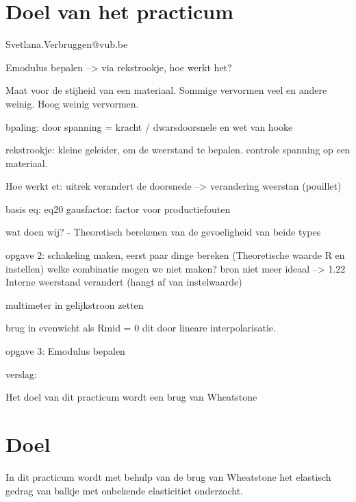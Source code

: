 \section{Doel van het practicum}

Svetlana.Verbruggen@vub.be

Emodulus bepalen
--> via rekstrookje, hoe werkt het?

Maat voor de stijheid van een materiaal. Sommige vervormen veel en andere weinig. Hoog weinig vervormen.

bpaling: door spanning = kracht / dwarsdoorsnele en wet van hooke

rekstrookje: kleine geleider, om de weerstand te bepalen. controle spanning op een materiaal.

Hoe werkt et: uitrek verandert de doorsnede --> verandering weerstan (pouillet)

basis eq: eq20
gausfactor: factor voor productiefouten

wat doen wij?
- Theoretisch berekenen van de gevoeligheid van beide types

opgave 2: schakeling maken, eerst paar dinge bereken (Theoretische waarde R en instellen)
welke combinatie mogen we niet maken?
bron niet meer ideaal --> 1.22
Interne weerstand verandert (hangt af van instelwaarde)

multimeter in gelijkstroon zetten

brug in evenwicht als Rmid = 0
dit door lineare interpolarisatie.

opgave 3: Emodulus bepalen

verslag:

Het doel van dit practicum wordt een brug van Wheatstone


\section{Doel}

In dit practicum wordt met behulp van de brug van Wheatstone
het elastisch gedrag van balkje met onbekende elasticitiet
onderzocht.
